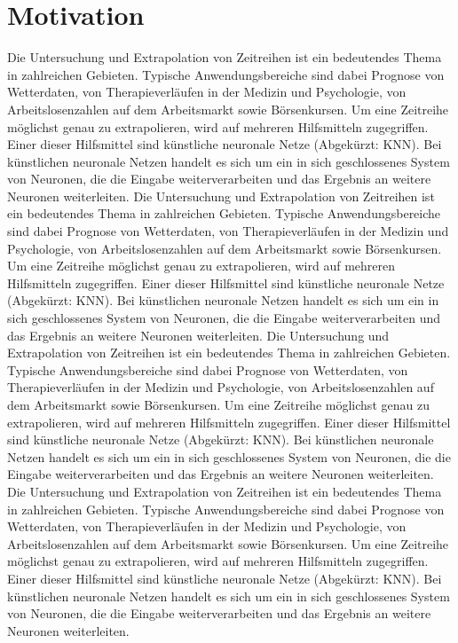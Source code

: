 \documentclass[a4paper,DIV11,bibliography=totoc,headings=normal,ngerman,headsepline]{scrreprt}
\begin{document}
\section{Motivation}
Die Untersuchung  und Extrapolation von Zeitreihen ist ein bedeutendes Thema in zahlreichen Gebieten. Typische Anwendungsbereiche sind dabei Prognose von Wetterdaten, von Therapieverläufen in der  Medizin und Psychologie, von Arbeitslosenzahlen auf dem Arbeitsmarkt sowie Börsenkursen. Um eine Zeitreihe möglichst genau zu extrapolieren, wird auf mehreren Hilfsmitteln zugegriffen. Einer dieser Hilfsmittel sind künstliche neuronale Netze (Abgekürzt: KNN). Bei künstlichen neuronale Netzen handelt es sich um ein in sich geschlossenes System von Neuronen, die die Eingabe weiterverarbeiten und das Ergebnis an weitere Neuronen weiterleiten.  
Die Untersuchung  und Extrapolation von Zeitreihen ist ein bedeutendes Thema in zahlreichen Gebieten. Typische Anwendungsbereiche sind dabei Prognose von Wetterdaten, von Therapieverläufen in der  Medizin und Psychologie, von Arbeitslosenzahlen auf dem Arbeitsmarkt sowie Börsenkursen. Um eine Zeitreihe möglichst genau zu extrapolieren, wird auf mehreren Hilfsmitteln zugegriffen. Einer dieser Hilfsmittel sind künstliche neuronale Netze (Abgekürzt: KNN). Bei künstlichen neuronale Netzen handelt es sich um ein in sich geschlossenes System von Neuronen, die die Eingabe weiterverarbeiten und das Ergebnis an weitere Neuronen weiterleiten. 
Die Untersuchung  und Extrapolation von Zeitreihen ist ein bedeutendes Thema in zahlreichen Gebieten. Typische Anwendungsbereiche sind dabei Prognose von Wetterdaten, von Therapieverläufen in der  Medizin und Psychologie, von Arbeitslosenzahlen auf dem Arbeitsmarkt sowie Börsenkursen. Um eine Zeitreihe möglichst genau zu extrapolieren, wird auf mehreren Hilfsmitteln zugegriffen. Einer dieser Hilfsmittel sind künstliche neuronale Netze (Abgekürzt: KNN). Bei künstlichen neuronale Netzen handelt es sich um ein in sich geschlossenes System von Neuronen, die die Eingabe weiterverarbeiten und das Ergebnis an weitere Neuronen weiterleiten. 
Die Untersuchung  und Extrapolation von Zeitreihen ist ein bedeutendes Thema in zahlreichen Gebieten. Typische Anwendungsbereiche sind dabei Prognose von Wetterdaten, von Therapieverläufen in der  Medizin und Psychologie, von Arbeitslosenzahlen auf dem Arbeitsmarkt sowie Börsenkursen. Um eine Zeitreihe möglichst genau zu extrapolieren, wird auf mehreren Hilfsmitteln zugegriffen. Einer dieser Hilfsmittel sind künstliche neuronale Netze (Abgekürzt: KNN). Bei künstlichen neuronale Netzen handelt es sich um ein in sich geschlossenes System von Neuronen, die die Eingabe weiterverarbeiten und das Ergebnis an weitere Neuronen weiterleiten. 
\end{document}
